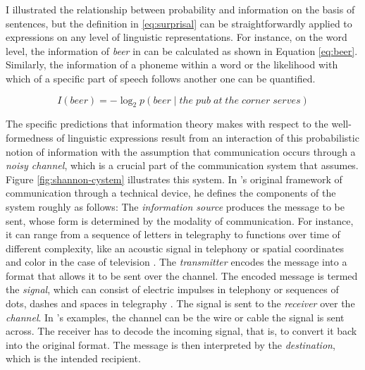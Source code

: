 I illustrated the relationship between probability and information on the basis of sentences, but the definition in \ref{eq:surprisal} can be straightforwardly applied to expressions on any level of linguistic representations. For instance, on the word level, the information of \textit{beer} in \Last[a] can be calculated as shown in Equation \ref{eq:beer}. Similarly, the information of a phoneme within a word or the likelihood with which  of a specific part of speech follows another one can be quantified.

\begin{equation}
 I(beer) = - \log_2 p(beer\mathbin{|}the\; pub\; at\; the\; corner\; serves) \label{eq:beer}
\end{equation}

The specific predictions that information theory makes with respect to the well-formedness of linguistic expressions result from an interaction of this probabilistic notion of information with the assumption that communication occurs through a \textit{noisy channel}, which is a crucial part of the communication system that \citet{shannon1948} assumes. Figure \ref{fig:shannon-cystem} illustrates this system. In \citeauthor{shannon1948}'s original framework of communication through a technical device, he defines the components of the system roughly as follows: The \textit{information source} produces the message to be sent, whose form is determined by the modality of communication. For instance, it can range from a sequence of letters in telegraphy to functions over time of different complexity, like an acoustic signal in telephony or spatial coordinates and color in the case of television \citep[380--381]{shannon1948}. The \textit{transmitter} encodes the message into a format that allows it to be sent over the channel. The encoded message is termed the \textit{signal}, which can consist of electric impulses in telephony or sequences of dots, dashes and spaces in telegraphy \citep[382]{shannon1948}. The signal is sent to the \textit{receiver} over the \textit{channel}. In \citeauthor{shannon1948}'s examples, the channel can be the wire or cable the signal is sent across. The receiver has to decode the incoming signal, that is, to convert it back into the original format. The message is then interpreted by the \textit{destination}, which is the intended recipient.

